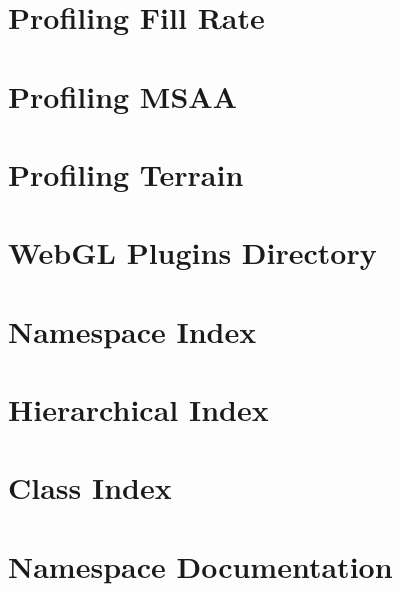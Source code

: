 \documentclass[twoside]{book}
\newcommand{\+}{\discretionary{\mbox{\scriptsize$\hookleftarrow$}}{}{}}
\begin{document}
\chapter{Profiling Fill Rate}
\label{_page_profiling_fill_rate}

\chapter{Profiling MSAA}
\label{_page_profiling_m_s_a_a}

\chapter{Profiling Terrain}
\label{_page_profiling_terrain}

\chapter{Web\+GL Plugins Directory}
\label{md__e___business__projects__o8_c__verse__verse____web_g_l__assets___o8_c_system___scripts__syste26b9807ee5d3bbcaf86da09a95c0a6d1}

\chapter{Namespace Index}

\chapter{Hierarchical Index}

\chapter{Class Index}

\chapter{Namespace Documentation}



\end{document}
